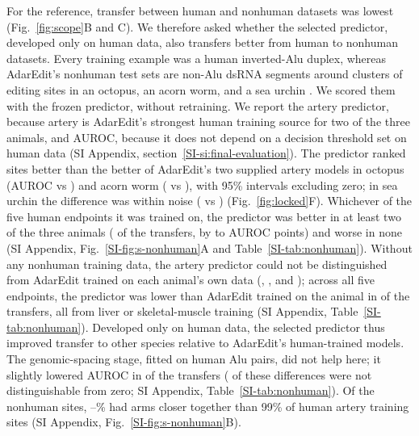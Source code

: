 \documentclass[9pt,twocolumn,twoside]{pnas-new}
\newcommand{\SIref}[1]{\ref*{SI-#1}}
\begin{document}
For the reference, transfer between human and nonhuman datasets was lowest (Fig.~\ref{fig:scope}B and C). We therefore asked whether the selected predictor, developed only on human data, also transfers better from human to nonhuman datasets. Every training example was a human inverted-Alu duplex, whereas AdarEdit's nonhuman test sets are non-Alu dsRNA segments around clusters of editing sites in an octopus, an acorn worm, and a sea urchin \cite{Rosenwasser2026AdarEdit}. We scored them with the frozen predictor, without retraining. We report the artery predictor, because artery is AdarEdit's strongest human training source for two of the three animals, and AUROC, because it does not depend on a decision threshold set on human data (SI Appendix, section~\SIref{si:final-evaluation}). The predictor ranked sites better than the better of AdarEdit's two supplied artery models in octopus (AUROC \NonhumanArteryAUROCOctopus{} vs \NonhumanAdarEditArteryAUROCOctopus{}) and acorn worm (\NonhumanArteryAUROCPtychodera{} vs \NonhumanAdarEditArteryAUROCPtychodera{}), with 95\% intervals excluding zero; in sea urchin the difference was within noise (\NonhumanArteryAUROCStrongylocentrotus{} vs \NonhumanAdarEditArteryAUROCStrongylocentrotus{}) (Fig.~\ref{fig:locked}F). Whichever of the five human endpoints it was trained on, the predictor was better in at least two of the three animals (\NonhumanBetterCount{} of the \NonhumanTransferCount{} transfers, by \NonhumanBetterDeltaMin{} to \NonhumanBetterDeltaMax{} AUROC points) and worse in none (SI Appendix, Fig.~\SIref{fig:s-nonhuman}A and Table~\SIref{tab:nonhuman}). Without any nonhuman training data, the artery predictor could not be distinguished from AdarEdit trained on each animal's own data (\NonhumanAdarEditOwnAUROCOctopus{}, \NonhumanAdarEditOwnAUROCPtychodera{}, and \NonhumanAdarEditOwnAUROCStrongylocentrotus{}); across all five endpoints, the predictor was lower than AdarEdit trained on the animal in \NonhumanOwnWorseCount{} of the \NonhumanTransferCount{} transfers, all from liver or skeletal-muscle training (SI Appendix, Table~\SIref{tab:nonhuman}). Developed only on human data, the selected predictor thus improved transfer to other species relative to AdarEdit's human-trained models. The genomic-spacing stage, fitted on human Alu pairs, did not help here; it slightly lowered AUROC in \NonhumanSpacingLowerCount{} of the \NonhumanTransferCount{} transfers (\NonhumanSpacingLowerTiedCount{} of these differences were not distinguishable from zero; SI Appendix, Table~\SIref{tab:nonhuman}). Of the nonhuman sites, \NonhumanBelowHumanPOneMin{}--\NonhumanBelowHumanPOneMax{}\% had arms closer together than 99\% of human artery training sites (SI Appendix, Fig.~\SIref{fig:s-nonhuman}B).
\end{document}
